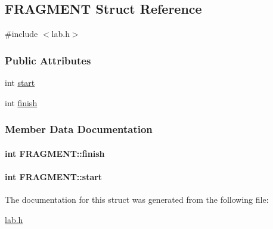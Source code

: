 \hypertarget{structFRAGMENT}{\subsection{F\+R\+A\+G\+M\+E\+N\+T Struct Reference}
\label{structFRAGMENT}
}


{\ttfamily \#include $<$lab.\+h$>$}

\subsubsection*{Public Attributes}
\begin{DoxyCompactItemize}
\item 
int \hyperlink{structFRAGMENT_a9a2c77dc5f1c259a9a063f8e6ae18724}{start}
\item 
int \hyperlink{structFRAGMENT_a3edee1f345e206cdc220b16d7d290018}{finish}
\end{DoxyCompactItemize}


\subsubsection{Member Data Documentation}
\hypertarget{structFRAGMENT_a3edee1f345e206cdc220b16d7d290018}{
\paragraph[{finish}]{\setlength{\rightskip}{0pt plus 5cm}int F\+R\+A\+G\+M\+E\+N\+T\+::finish}}\label{structFRAGMENT_a3edee1f345e206cdc220b16d7d290018}
\hypertarget{structFRAGMENT_a9a2c77dc5f1c259a9a063f8e6ae18724}{
\paragraph[{start}]{\setlength{\rightskip}{0pt plus 5cm}int F\+R\+A\+G\+M\+E\+N\+T\+::start}}\label{structFRAGMENT_a9a2c77dc5f1c259a9a063f8e6ae18724}


The documentation for this struct was generated from the following file\+:\begin{DoxyCompactItemize}
\item 
\hyperlink{lab_8h}{lab.\+h}\end{DoxyCompactItemize}
